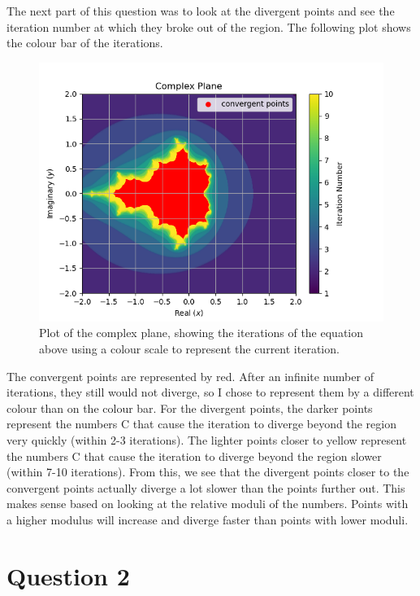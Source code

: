 \documentclass{article}
\begin{document}
The next part of this question was to look at the divergent points and see the iteration number at which they broke out of the region. The following plot shows the colour bar of the iterations.

\begin{figure}[!htb]
    \centering
    \includegraphics[scale=0.9]{Q1_updated1 plot.png}
    \caption{Plot of the complex plane, showing the iterations of the equation above using a colour scale to represent the current iteration.}
    \label{fig:Q1_plot2.png}
\end{figure}

The convergent points are represented by red. After an infinite number of iterations, they still would not diverge, so I chose to represent them by a different colour than on the colour bar. For the divergent points, the darker points represent the numbers C that cause the iteration to diverge beyond the region very quickly (within 2-3 iterations). The lighter points closer to yellow represent the numbers C that cause the iteration to diverge beyond the region slower (within 7-10 iterations).
From this, we see that the divergent points closer to the convergent points actually diverge a lot slower than the points further out. This makes sense based on looking at the relative moduli of the numbers. Points with a higher modulus will increase and diverge faster than points with lower moduli.
\newpage

\section*{Question 2}
\end{document}
